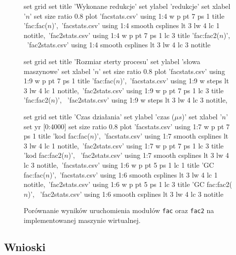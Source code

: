 \begin{figure}
\begin{multicols}{2}
\begin{gnuplot}[terminal=epslatex,terminaloptions=color,scale=0.7]
	set grid
	set title 'Wykonane redukcje'
	set ylabel 'redukcje'
	set xlabel '$n$'
	set size ratio 0.8
	plot 'facstats.csv' using 1:4 w p pt 7 ps 1 title 'fac:fac($n$)',\
			'facstats.csv' using 1:4 smooth csplines lt 3 lw 4 lc 1 notitle,\
			'fac2stats.csv' using 1:4 w p pt 7 ps 1 lc 3 title 'fac:fac2($n$)', \
			'fac2stats.csv' using 1:4 smooth csplines lt 3 lw 4 lc 3 notitle
\end{gnuplot}


\begin{gnuplot}[terminal=epslatex,terminaloptions=color,scale=0.7]
	set grid
	set title 'Rozmiar sterty procesu'
	set ylabel 'słowa maszynowe'
	set xlabel '$n$'
	set size ratio 0.8
	plot 'facstats.csv' using 1:9 w p pt 7 ps 1 title 'fac:fac($n$)',\
			'facstats.csv' using 1:9 w steps lt 3 lw 4 lc 1 notitle,\
			'fac2stats.csv' using 1:9 w p pt 7 ps 1 lc 3 title 'fac:fac2($n$)', \
			'fac2stats.csv' using 1:9 w steps lt 3 lw 4 lc 3 notitle,\
\end{gnuplot}

\begin{gnuplot}[terminal=epslatex,terminaloptions=color,scale=0.7]
	set grid
	set title 'Czas działania'
	set ylabel 'czas ($\mu s$)'
	set xlabel '$n$'
	set yr [0:4000]
	set size ratio 0.8
	plot 'facstats.csv' using 1:7 w p pt 7 ps 1 title 'kod fac:fac($n$)',\
			'facstats.csv' using 1:7 smooth csplines lt 3 lw 4 lc 1 notitle,\
			'fac2stats.csv' using 1:7 w p pt 7 ps 1 lc 3 title 'kod fac:fac2($n$)', \
			'fac2stats.csv' using 1:7 smooth csplines lt 3 lw 4 lc 3 notitle,\
			'facstats.csv' using 1:6 w p pt 5 ps 1 lc 1 title 'GC fac:fac($n$)',\
			'facstats.csv' using 1:6 smooth csplines lt 3 lw 4 lc 1 notitle,\
			'fac2stats.csv' using 1:6 w p pt 5 ps 1 lc 3 title 'GC fac:fac2($n$)', \
			'fac2stats.csv' using 1:6 smooth csplines lt 3 lw 4 lc 3 notitle
\end{gnuplot}

\end{multicols}

\caption{Porównanie wyników uruchomienia modułów \texttt{fac} oraz \texttt{fac2} na implementowanej maszynie wirtualnej.}
\label{fig:facGraphs}

\end{figure}

\subsection{Wnioski}

